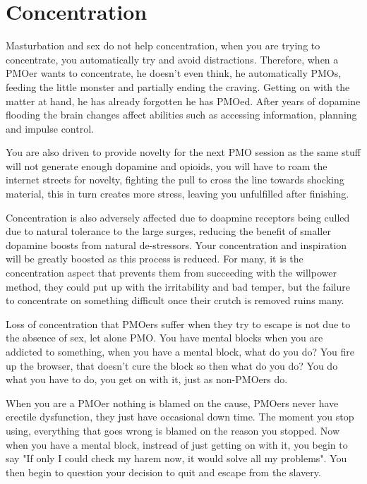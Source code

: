 \documentclass[easypeasy.tex]{subfiles}
\begin{document}
\section{Concentration}

Masturbation and sex do not help concentration, when you are trying to concentrate, you automatically try and avoid distractions. Therefore, when a PMOer wants to concentrate, he doesn't even think, he automatically PMOs, feeding the little monster and partially ending the craving. Getting on with the matter at hand, he has already forgotten he has PMOed. After years of dopamine flooding the brain changes affect abilities such as accessing information, planning and impulse control.

You are also driven to provide novelty for the next PMO session as the same stuff will not generate enough dopamine and opioids, you will have to roam the internet streets for novelty, fighting the pull to cross the line towards shocking material, this in turn creates more stress, leaving you unfulfilled after finishing.

Concentration is also adversely affected due to doapmine receptors being culled due to natural tolerance to the large surges, reducing the benefit of smaller dopamine boosts from natural de-stressors. Your concentration and inspiration will be greatly boosted as this process is reduced. For many, it is the concentration aspect that prevents them from succeeding with the willpower method, they could put up with the irritability and bad temper, but the failure to concentrate on something difficult once their crutch is removed ruins many.

Loss of concentration that PMOers suffer when they try to escape is not due to the absence of sex, let alone PMO. You have mental blocks when you are addicted to something, when you have a mental block, what do you do? You fire up the browser, that doesn't cure the block so then what do you do? You do what you have to do, you get on with it, just as non-PMOers do.

When you are a PMOer nothing is blamed on the cause, PMOers never have erectile dysfunction, they just have occasional down time. The moment you stop using, everything that goes wrong is blamed on the reason you stopped. Now when you have a mental block, instread of just getting on with it, you begin to say "If only I could check my harem now, it would solve all my problems". You then begin to question your decision to quit and escape from the slavery.
\end{document}
